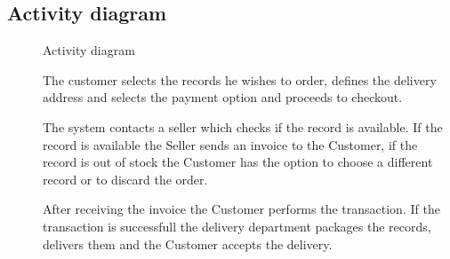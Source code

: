 \documentclass[11pt,a4paper]{article}
\begin{document}
\subsection{Activity diagram}
\begin{figure}[htb]
    \begin{center}
        \setlength\fboxsep{0pt}
        \caption{Activity diagram}
        \label{fig:activ_diag}
    \end{center}
\end{figure}
\begin{description}
    \item[]
        The customer selects the records he wishes to order, defines the delivery
        address and selects the payment option and proceeds to checkout.
    \item[]
        The system contacts a seller which checks if the record is available.
        If the record is available the Seller sends an invoice to the Customer,
        if the record is out of stock the Customer has the option to choose a different
        record or to discard the order.
    \item[]
        After receiving the invoice the Customer performs the transaction.
        If the transaction is successfull the delivery department packages the records,
        delivers them and the Customer accepts the delivery.
\end{description}
\end{document}
